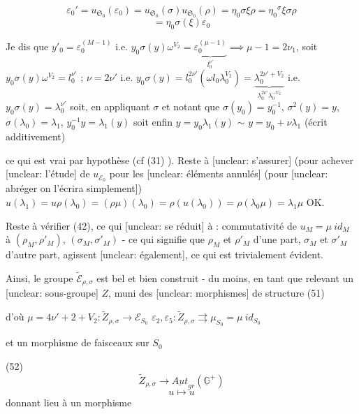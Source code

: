 $$ \varepsilon_0' = u_{\mathfrak{S}_0}(\varepsilon_0) = u_{\mathfrak{S}_0}(\sigma) u_{\mathfrak{S}_0}(\rho) = \eta_0 \sigma \xi \rho = \eta_0 {}^{\sigma}\xi \sigma \rho $$
$$ = \eta_0 \sigma(\xi) \varepsilon_0 $$

\newpage


Je dis que
$y'_0 = \varepsilon_0^{(M-1)}$ i.e. $y_0 \sigma(y) \omega^{V_2} = \underbrace{\varepsilon_0^{(\mu-1)}}_{l_0^{\nu'}} \implies \mu-1=2\nu_1$, soit
$y_0 \sigma(y) \omega^{V_2} = l_0^{\nu'}$ ; $\nu = 2\nu'$ i.e.
$y_0 \sigma(y) = l_0^{2\nu'} (\omega l_0 \lambda_0^{V_2}) = \underbrace{\lambda_0^{2\nu'+V_2}}_{\lambda_0^{2\nu'} \lambda_0^{-V_2}}$ i.e.
$y_0 \sigma(y) = \lambda_0^{\nu'}$ soit, en appliquant $\sigma$ et notant
que $\sigma(y_0) = y_0^{-1}$, $\sigma^2(y)=y$, $\sigma(\lambda_0)=\lambda_1$,
$y_0^{-1} y = \lambda_1(y)$ soit enfin $y = y_0 \lambda_1(y)$ $\sim$
$y = y_0 + \nu \lambda_1$ (écrit additivement)

ce qui est vrai par hypothèse (cf (31) ).
Reste à [unclear: s'assurer] (pour achever [unclear: l'étude] de $u_{\mathcal{E}_0}$ pour
les [unclear: éléments annulés] (pour [unclear: abréger on l'écrira simplement])
$u(\lambda_1) = u\rho(\lambda_0) = (\rho \mu)(\lambda_0) = \rho(u(\lambda_0)) = \rho(\lambda_0 \mu) = \lambda_1 \mu$
OK.

Reste à vérifier (42), ce qui [unclear: se réduit] à :
commutativité de $u_M = \mu\ id_M$ à
$(\rho_M, \rho'_M)$, $(\sigma_M, \sigma'_M)$ - ce qui signifie que
$\rho_M$ et $\rho'_M$ d'une part, $\sigma_M$ et $\sigma'_M$ d'autre part,
agissent [unclear: également], ce qui est trivialement évident.

Ainsi, le groupe $\tilde{\mathcal{E}}_{\rho, \sigma}$ est bel et
bien construit - du moins, en tant que
relevant un [unclear: sous-groupe] $Z$, muni des [unclear: morphismes]
de structure
(51)
d'où $\mu = 4\nu' + 2 + V_2 : \tilde{Z}_{\rho, \sigma} \to \mathcal{E}_{S_0}$
$\varepsilon_2, \varepsilon_5 : \tilde{Z}_{\rho, \sigma} \rightrightarrows \mu_{S_0} = \mu\ id_{S_0}$

\newpage


et un morphisme de faisceaux sur $S_0$

(52) $$\tilde{Z}_{\rho,\sigma} \longrightarrow \underline{Aut}_{gr} (\underline{\mathbb{G}}^+)$$
$$u \longmapsto u$$
donnant lieu à un morphisme

